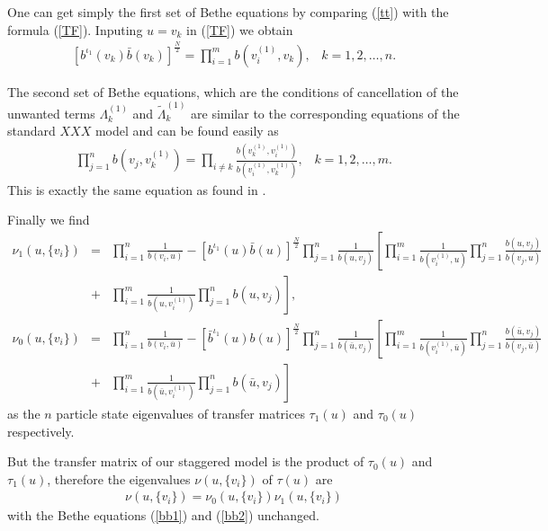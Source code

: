 \documentclass[a4paper,12pt]{article}
\newcommand{\nn}{\nonumber}
\begin{document}
One can get simply the first set of Bethe equations by comparing (\ref{tt})
with the formula (\ref{TF}). Inputing $u=v_k$ in (\ref{TF}) we obtain
\begin{eqnarray}
\label{bb1}
[b^{\iota_1}(v_k)\bar{b}(v_k)]^{\frac{N}{2}}=\prod_{i=1}^mb(v_i^{(1)},v_k),\;\;
\;k=1,2,\dots ,n.
\end{eqnarray}

The second set of Bethe equations, which are the conditions of cancellation of
the unwanted terms $\Lambda_k^{(1)}$ and $\tilde{\Lambda}_k^{(1)}$ are 
similar to the corresponding equations of the standard $XXX$ model and can 
be found easily as 
\begin{eqnarray}
\label{bb2}
\prod_{j=1}^nb(v_j,v_k^{(1)})=\prod_{i\neq k}\frac{b(v_k^{(1)},v_i^{(1)})}
{b(v_i^{(1)},v_k^{(1)})},\;\;\;k=1,2,\dots,m.
\end{eqnarray}
This is exactly the same equation as found in \cite{EK}.

Finally we find
\begin{eqnarray}
\label{nu3}
\nu_1(u,\{v_i\})&=&\prod_{i=1}^n\frac{1}{b(v_i,u)}-
[b^{\iota_1}(u)\bar{b}(u)]^\frac{N}{2}
\prod_{j=1}^n\frac{1}{b(u,v_j)}\left[\prod_{i=1}^m\frac{1}{b(v_i^{(1)},u)}
\prod_{j=1}^n\frac{b(u,v_j)}{b(v_j,u)}\right.\nn\\
&+&\left.\prod_{i=1}^m\frac{1}{b(u,v_i^{(1)})}
\prod_{j=1}^nb(u,v_j)\right],\nn\\
\nu_0(u,\{v_i\})&=&\prod_{i=1}^n\frac{1}{b(v_i,\bar{u})}-
[\bar{b}^{\iota_1}(u) b(u)]^\frac{N}{2}
\prod_{j=1}^n\frac{1}{b(\bar{u},v_j)}
\left[\prod_{i=1}^m\frac{1}{b(v_i^{(1)},\bar{u})}
\prod_{j=1}^n\frac{b(\bar{u},v_j)}{b(v_j,\bar{u})}\right.\nn\\
&+&\left.\prod_{i=1}^m\frac{1}{b(\bar{u},v_i^{(1)})}
\prod_{j=1}^nb(\bar{u},v_j)\right] 
\end{eqnarray}
as the $n$ particle state eigenvalues of transfer matrices $\tau_1(u)$ 
and $\tau_0(u)$ respectively.

But the transfer matrix of our staggered model is the product of
$\tau_0(u)$ 
and $\tau_1(u)$, therefore the eigenvalues $\nu(u,\{v_i\})$ 
of $\tau(u)$ are
\begin{eqnarray}
\label{nu4}
\nu(u,\{v_i\})=\nu_0(u,\{v_i\})\nu_1(u,\{v_i\})
\end{eqnarray}
with the Bethe equations (\ref{bb1}) and (\ref{bb2}) unchanged.
 
\end{document}
